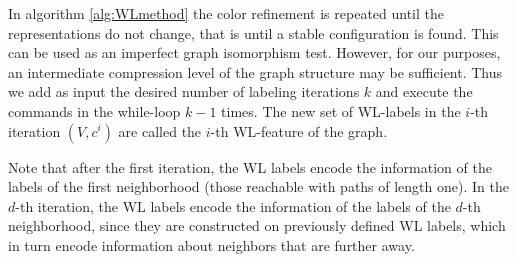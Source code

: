 In algorithm \ref{alg:WLmethod} the color refinement is repeated until the representations do not change, that is until a stable configuration is found. This can be used as an imperfect graph isomorphism test. %
However, for our purposes, an intermediate compression level of the graph structure may be sufficient. 
Thus we add as input the desired number of labeling iterations $k$ and execute the commands in the while-loop $k-1$ times.
The new set of WL-labels in the $i$-th iteration $(V, c^i)$ are called the $i$-th WL-feature of the graph.

Note that after the first iteration, the WL labels encode the information of the labels of the first neighborhood (those reachable with paths of length one).
In the $d$-th iteration, the WL labels encode the information of the labels of the $d$-th neighborhood, since they are constructed on previously defined WL labels, 
which in turn encode information about neighbors that are further away.
%

